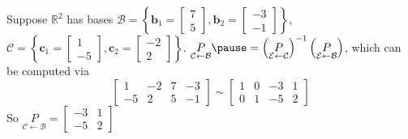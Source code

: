 \documentclass{beamer}
\theoremstyle{definition}
\theoremstyle{remark}
\begin{document}
\begin{frame}[t]
\begin{example}
Suppose $\mathbb R^2$ has bases $\mathcal B=\left\{\mathbf b_1=\begin{bmatrix}
7\\5
\end{bmatrix},\mathbf b_2=\begin{bmatrix}
-3\\-1
\end{bmatrix}\right\}$, $\mathcal C=\left\{\mathbf c_1=\begin{bmatrix}
1\\-5
\end{bmatrix},\mathbf c_2=\begin{bmatrix}
-2\\2
\end{bmatrix}\right\}$. $\underset{\mathcal C\leftarrow\mathcal B}{P}\pause=\left(\underset{\mathcal E\leftarrow\mathcal C}{P}\right)^{-1}\left(\underset{\mathcal E\leftarrow\mathcal B}{P}\right)$, which can be computed via\pause
\[
\left[\begin{array}{cc|cc}
1&-2&7&-3\\
-5&2&5&-1
\end{array}\right]\sim\left[\begin{array}{cc|cc}
1&0&-3&1\\
0&1&-5&2
\end{array}\right]
\]\pause
So $\underset{\mathcal C\leftarrow\mathcal B}{P}=\begin{bmatrix}
-3&1\\
-5&2
\end{bmatrix}$
\vspace{-4mm}
\begin{center}
\end{center}
\end{example}
\end{frame}
\end{document}
